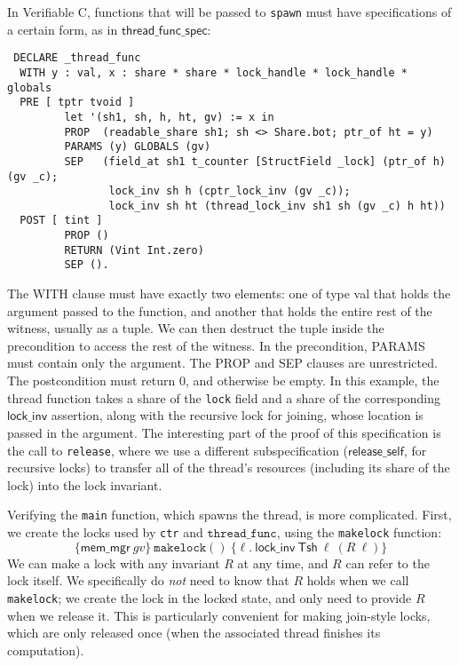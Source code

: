 \documentclass[11pt]{article}
\begin{document}
In Verifiable C, functions that will be passed to \texttt{spawn} must have specifications of a certain form, as in $\mathsf{thread\_func\_spec}$:
\begin{verbatim}
 DECLARE _thread_func
  WITH y : val, x : share * share * lock_handle * lock_handle * globals
  PRE [ tptr tvoid ]
         let '(sh1, sh, h, ht, gv) := x in
         PROP  (readable_share sh1; sh <> Share.bot; ptr_of ht = y)
         PARAMS (y) GLOBALS (gv)
         SEP   (field_at sh1 t_counter [StructField _lock] (ptr_of h) (gv _c);
                lock_inv sh h (cptr_lock_inv (gv _c));
                lock_inv sh ht (thread_lock_inv sh1 sh (gv _c) h ht))
  POST [ tint ]
         PROP ()
         RETURN (Vint Int.zero)
         SEP ().
\end{verbatim}
The \textsf{WITH} clause must have exactly two elements: one of type \textsf{val} that holds the argument passed to the function, and another that holds the entire rest of the witness, usually as a tuple. We can then destruct the tuple inside the precondition to access the rest of the witness. In the precondition, \textsf{PARAMS} must contain only the argument. The \textsf{PROP} and \textsf{SEP} clauses are unrestricted. The postcondition must return 0, and otherwise be empty. In this example, the thread function takes a share of the \texttt{lock} field and a share of the corresponding $\mathsf{lock\_inv}$ assertion, along with the recursive lock for joining, whose location is passed in the argument. The interesting part of the proof of this specification is the call to \texttt{release}, where we use a different subspecification ($\mathsf{release\_self}$, for recursive locks) to transfer all of the thread's resources (including its share of the lock) into the lock invariant.

Verifying the \texttt{main} function, which spawns the thread, is more complicated. First, we create the locks used by \texttt{ctr} and $\mathtt{thread\_func}$, using the \texttt{makelock} function:
$$\{\mathsf{mem\_mgr}\ \mathit{gv}\}\ \texttt{makelock}()\ \{\ell.\ \mathsf{lock\_inv}\ \mathsf{Tsh}\ \ell\ (R\ \ell)\}$$
We can make a lock with any invariant $R$ at any time, and $R$ can refer to the lock itself. We specifically do \emph{not} need to know that $R$ holds when we call \texttt{makelock}; we create the lock in the locked state, and only need to provide $R$ when we release it. This is particularly convenient for making join-style locks, which are only released once (when the associated thread finishes its computation).
\end{document}

